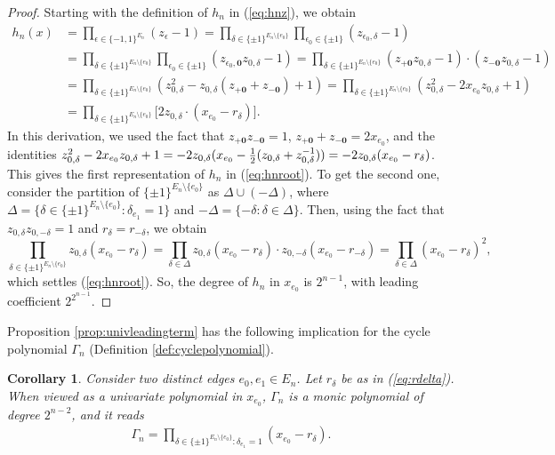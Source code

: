 \documentclass[a4paper, 11pt, twoside]{article}
\newcommand{\azero}{\mathbf{0}}
\theoremstyle{plain}
\newtheorem{corollary}[theorem]{Corollary}
\begin{document}
\begin{proof}
Starting  with the definition of $h_n$ in (\ref{eq:hnz}), we obtain
\begin{align*}
h_n(x)& =\prod_{\epsilon \in \{-1,1\}^{E_n}} (z_\epsilon -1)
= \prod_{\delta\in\{\pm 1\}^{E_n\setminus \{e_0\}}} \prod_{\epsilon_0\in \{\pm 1\}}
(z_{\epsilon_0,\delta}-1)\\
& =\prod_{\delta\in\{\pm 1\}^{E_n\setminus \{e_0\}}} \prod_{\epsilon_0\in \{\pm 1\}}(z_{\epsilon_0,\azero} z_{0,\delta}-1)
 =  \prod_{\delta\in\{\pm 1\}^{E_n\setminus \{e_0\}}}
(z_{+\azero}z_{0,\delta}-1)\cdot (z_{-\azero}z_{0,\delta}-1)\\
& =  \prod_{\delta\in\{\pm 1\}^{E_n\setminus \{e_0\}}}
(z_{0,\delta}^2-z_{0,\delta}(z_{+\azero}+z_{-\azero})+1)
= \prod_{\delta\in\{\pm 1\}^{E_n\setminus \{e_0\}}}
(z_{0,\delta}^2 
-2x_{e_0}   z_{0,\delta}
+1)\\
&=  \prod_{\delta\in\{\pm 1\}^{E_n\setminus \{e_0\}}} \Big[2 z_{0,\delta}\cdot (x_{e_0}-r_\delta)\Big].
\end{align*}
In this derivation, we used the fact that $z_{+\azero} z_{-\azero}=1$, $z_{+\azero}+z_{-\azero}=2x_{e_0}$,
and the identities $z_{0,\delta}^2-2x_{e_0}z_{0,\delta}+1 =-2z_{0,\delta} (x_{e_0}-{1\over 2}(z_{0,\delta}+ z_{0,\delta}^{-1}))
= -2z_{0,\delta} (x_{e_0}-r_\delta)$.
This gives the first representation of $h_n$ in (\ref{eq:hnroot}). 
To get the second one, consider the partition of $\{\pm 1\}^{E_n\setminus\{e_0\}}$ as $ \Delta\cup (-\Delta)$, where 
$\Delta=\{\delta\in \{\pm 1\}^{E_n\setminus\{e_0\}}:\delta_{e_1}=1\}$ and  $-\Delta=\{-\delta:\delta\in\Delta\}$.
Then, using  the fact that $z_{0,\delta} z_{0,-\delta}=1$ and $r_\delta=r_{-\delta}$, we obtain
\[
\prod_{\delta\in \{\pm 1\}^{E_n\setminus \{e_0\}}} z_{0,\delta} (x_{e_0}-r_\delta)
 =\prod_{\delta\in \Delta} z_{0,\delta} (x_{e_0}-r_\delta) \cdot z_{0,-\delta} (x_{e_0}-r_{-\delta})
 = \prod_{\delta\in \Delta} (x_{e_0}-r_\delta)^2,
 \]
which settles  (\ref{eq:hnroot}). So, the degree of $h_n$ in $x_{e_0}$ is $2^{n-1}$, with leading coefficient $2^{2^{n-1}}$.
\end{proof}


Proposition \ref{prop:univleadingterm} has the following implication for the cycle polynomial $\Gamma_n$ (Definition \ref{def:cyclepolynomial}).

\begin{corollary} \label{cor:univleadingterm}
  Consider two distinct edges $e_0,e_1\in E_n$. Let $r_\delta$ be as in (\ref{eq:rdelta}). When viewed as a univariate polynomial in $x_{e_0}$, $\Gamma_n$ is a monic polynomial of degree $2^{n-2}$, and it reads
  \begin{align}\label{eq:Gammauniv}
\Gamma_n= \prod_{\delta\in \{\pm 1\}^{E_n\setminus \{e_0\}}: \delta_{e_1}=1} (x_{e_0}-r_\delta).
\end{align}
\end{corollary}
\end{document}
